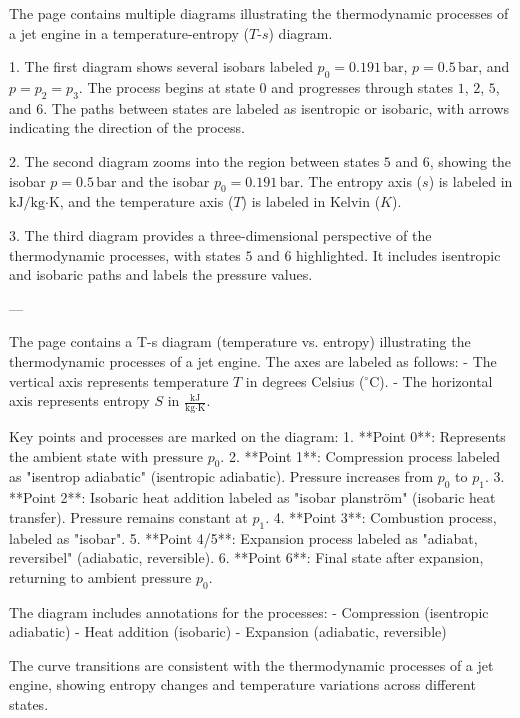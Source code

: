 The page contains multiple diagrams illustrating the thermodynamic processes of a jet engine in a temperature-entropy (\(T\)-\(s\)) diagram.  

1. The first diagram shows several isobars labeled \(p_0 = 0.191 \, \text{bar}\), \(p = 0.5 \, \text{bar}\), and \(p = p_2 = p_3\). The process begins at state \(0\) and progresses through states \(1\), \(2\), \(5\), and \(6\). The paths between states are labeled as isentropic or isobaric, with arrows indicating the direction of the process.  

2. The second diagram zooms into the region between states \(5\) and \(6\), showing the isobar \(p = 0.5 \, \text{bar}\) and the isobar \(p_0 = 0.191 \, \text{bar}\). The entropy axis (\(s\)) is labeled in \(\text{kJ}/\text{kg·K}\), and the temperature axis (\(T\)) is labeled in Kelvin (\(K\)).  

3. The third diagram provides a three-dimensional perspective of the thermodynamic processes, with states \(5\) and \(6\) highlighted. It includes isentropic and isobaric paths and labels the pressure values.  

---

The page contains a T-s diagram (temperature vs. entropy) illustrating the thermodynamic processes of a jet engine. The axes are labeled as follows:  
- The vertical axis represents temperature \( T \) in degrees Celsius (\( ^\circ \text{C} \)).  
- The horizontal axis represents entropy \( S \) in \( \frac{\text{kJ}}{\text{kg·K}} \).  

Key points and processes are marked on the diagram:  
1. **Point 0**: Represents the ambient state with pressure \( p_0 \).  
2. **Point 1**: Compression process labeled as "isentrop adiabatic" (isentropic adiabatic). Pressure increases from \( p_0 \) to \( p_1 \).  
3. **Point 2**: Isobaric heat addition labeled as "isobar planström" (isobaric heat transfer). Pressure remains constant at \( p_1 \).  
4. **Point 3**: Combustion process, labeled as "isobar".  
5. **Point 4/5**: Expansion process labeled as "adiabat, reversibel" (adiabatic, reversible).  
6. **Point 6**: Final state after expansion, returning to ambient pressure \( p_0 \).  

The diagram includes annotations for the processes:  
- Compression (isentropic adiabatic)  
- Heat addition (isobaric)  
- Expansion (adiabatic, reversible)  

The curve transitions are consistent with the thermodynamic processes of a jet engine, showing entropy changes and temperature variations across different states.